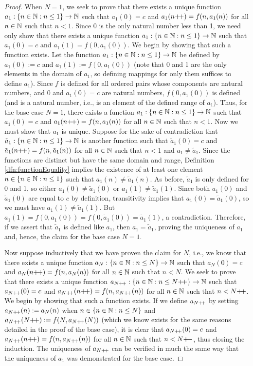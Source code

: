 \documentclass[../main.tex]{subfiles}
\begin{document}
\begin{enumerate}[ref={\thesection.\arabic*}]
\begin{proof}
        When $N=1$, we seek to prove that there exists a unique function $a_1:\{n\in\mathbb{N}:n\leq 1\}\to\mathbb{N}$ such that $a_1(0)=c$ and $a_1(n{+\!+})=f(n,a_1(n))$ for all $n\in\mathbb{N}$ such that $n<1$. Since 0 is the only natural number less than 1, we need only show that there exists a unique function $a_1:\{n\in\mathbb{N}:n\leq 1\}\to\mathbb{N}$ such that $a_1(0)=c$ and $a_1(1)=f(0,a_1(0))$. We begin by showing that such a function exists. Let the function $a_1:\{n\in\mathbb{N}:n\leq 1\}\to\mathbb{N}$ be defined by $a_1(0):=c$ and $a_1(1):=f(0,a_1(0))$ (note that 0 and 1 are the only elements in the domain of $a_1$, so defining mappings for only them suffices to define $a_1$). Since $f$ is defined for all ordered pairs whose components are natural numbers, and 0 and $a_1(0)=c$ are natural numbers, $f(0,a_1(0))$ is defined (and is a natural number, i.e., is an element of the defined range of $a_1$). Thus, for the base case $N=1$, there exists a function $a_1:\{n\in\mathbb{N}:n\leq 1\}\to\mathbb{N}$ such that $a_1(0)=c$ and $a_1(n{+\!+})=f(n,a_1(n))$ for all $n\in\mathbb{N}$ such that $n<1$. Now we must show that $a_1$ is unique. Suppose for the sake of contradiction that $\tilde{a}_1:\{n\in\mathbb{N}:n\leq 1\}\to\mathbb{N}$ is another function such that $\tilde{a}_1(0)=c$ and $\tilde{a}_1(n{+\!+})=f(n,\tilde{a}_1(n))$ for all $n\in\mathbb{N}$ such that $n<1$ and $a_1\neq\tilde{a}_1$. Since the functions are distinct but have the same domain and range, Definition \ref{dfn:functionEquality} implies the existence of at least one element $n\in\{n\in\mathbb{N}:n\leq 1\}$ such that $a_1(n)\neq\tilde{a}_1(n)$. As before, $\tilde{a}_1$ is only defined for 0 and 1, so either $a_1(0)\neq\tilde{a}_1(0)$ or $a_1(1)\neq\tilde{a}_1(1)$. Since both $a_1(0)$ and $\tilde{a}_1(0)$ are equal to $c$ by definition, transitivity implies that $a_1(0)=\tilde{a}_1(0)$, so we must have $a_1(1)\neq\tilde{a}_1(1)$. But $a_1(1)=f(0,a_1(0))=f(0,\tilde{a}_1(0))=\tilde{a}_1(1)$, a contradiction. Therefore, if we assert that $\tilde{a}_1$ is defined like $a_1$, then $a_1=\tilde{a}_1$, proving the uniqueness of $a_1$ and, hence, the claim for the base case $N=1$.\par
        Now suppose inductively that we have proven the claim for $N$, i.e., we know that there exists a unique function $a_N:\{n\in\mathbb{N}:n\leq N\}\to\mathbb{N}$ such that $a_N(0)=c$ and $a_N(n{+\!+})=f(n,a_N(n))$ for all $n\in\mathbb{N}$ such that $n<N$. We seek to prove that there exists a unique function $a_{N{+\!+}}:\{n\in\mathbb{N}:n\leq N{+\!+}\}\to\mathbb{N}$ such that $a_{N{+\!+}}(0)=c$ and $a_{N{+\!+}}(n{+\!+})=f(n,a_{N{+\!+}}(n))$ for all $n\in\mathbb{N}$ such that $n<N{+\!+}$. We begin by showing that such a function exists. If we define $a_{N{+\!+}}$ by setting $a_{N{+\!+}}(n):=a_N(n)$ when $n\in\{n\in\mathbb{N}:n\leq N\}$ and $a_{N{+\!+}}(N{+\!+}):=f(N,a_{N{+\!+}}(N))$ (which we know exists for the same reasons detailed in the proof of the base case), it is clear that $a_{N{+\!+}}(0)=c$ and $a_{N{+\!+}}(n{+\!+})=f(n,a_{N{+\!+}}(n))$ for all $n\in\mathbb{N}$ such that $n<N{+\!+}$, thus closing the induction. The uniqueness of $a_{N{+\!+}}$ can be verified in much the same way that the uniqueness of $a_1$ was demonstrated for the base case.\par

\end{proof}
\end{enumerate}
\end{document}

